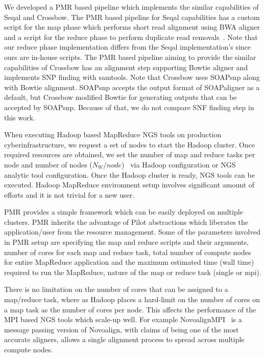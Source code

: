 \documentclass{acm_proc_article-sp}
\begin{document}
We developed a PMR based pipeline which implements the similar capabilities of Seqal
and Crossbow.  The PMR based pipeline for Seqal capabilities has a
custom script for the map phase which performs short read alignment using BWA
aligner and a script for the reduce phase to perform duplicate read removals~\cite{seal_2011_mapred}.  Note that our reduce
phase implementation differs from the Seqal implementation's since ours are in-house scripts.  The PMR based pipeline aiming to provide the similar capabilities of Crossbow has an alignment step supporting Bowtie aligner and implements SNP finding with samtools.  Note that Crossbow uses SOAPsnp along with Bowtie alignment.   SOAPsnp accepts the output format of SOAPaligner as a default, but Crossbow modified Bowtie for generating outputs that can be accepted by SOAPsnp.  Because of that, we do not compare SNF finding step in this work.


When executing Hadoop based MapReduce NGS tools on production
cyberinfrastructure, we request a set of nodes to start the Hadoop
cluster. Once required resources are obtained, we set the number of
map and reduce tasks per node and number of nodes
($N_{W}/node$)~ via Hadoop
configuration or NGS analytic tool configuration.  Once the Hadoop
cluster is ready, NGS tools can be executed. Hadoop MapReduce
environment setup involves significant amount of efforts and it is not
trivial for a new user.

PMR provides a simple framework which can be easily deployed on
multiple clusters. PMR inherits the advantage of Pilot abstractions
which liberates the application/user from the resource
management. Some of the parameters involved in PMR setup are
specifying the map and reduce scripts and their arguments, number of
cores for each map and reduce task, total number of compute nodes for
entire MapReduce application and the maximum estimated time (wall
time) required to run the MapReduce, nature of the map or reduce task
(single or mpi).

There is no limitation on the number of cores that can be assigned to
a map/reduce task, where as Hadoop places a hard-limit on the number
of cores on a map task as the number of cores per node.   This affects
the performance of the MPI based NGS tools which scale-up well. For
example NovoalignMPI~\cite{novo-align} is a message passing version of
Novoalign, with claims of being one of the most accurate aligners,
allows a single alignment process to spread across multiple compute
nodes.
\end{document}
